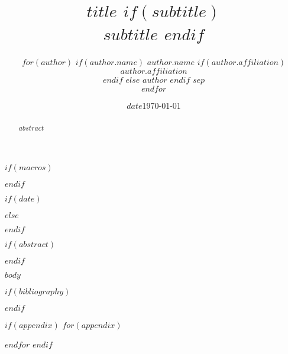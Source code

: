 \documentclass[12pt]{article}
\begin{document}
$if(macros)$

$endif$

\newcommand{\pl}[1]{\textsf{PL#1}}
\newcommand{\Cov}{\ensuremath{\mbox{\textsf{Cov}}}}
\newcommand{\Diag}{\ensuremath{\mbox{\textsf{Diag}}}}
\newcommand{\Bias}{\ensuremath{\mbox{\textsf{Bias}}}}
\newcommand{\Astar}[1]{\ensuremath{#1^{^*}}}
\thispagestyle{plain}
\pagestyle{damian}

\title{\textsf{\LARGE $title$ $if(subtitle)$ \\\medskip $subtitle$ $endif$}}
\author{$for(author)$ $if(author.name)$ $author.name$ $if(author.affiliation)$ \\ $author.affiliation$ \\ $endif$ $else$ $author$ $endif$ $sep$ \\ $endfor$}

$if(date)$ \date{$date$} $else$ \date{\today} $endif$

\maketitle

\newpage

$if(abstract)$
\begin{abstract}
$abstract$
\end{abstract}
\newpage
$endif$

$body$

$if(bibliography)$


$endif$


$if(appendix)$
\appendix
$for(appendix)$

$endfor$
$endif$
\end{document}
